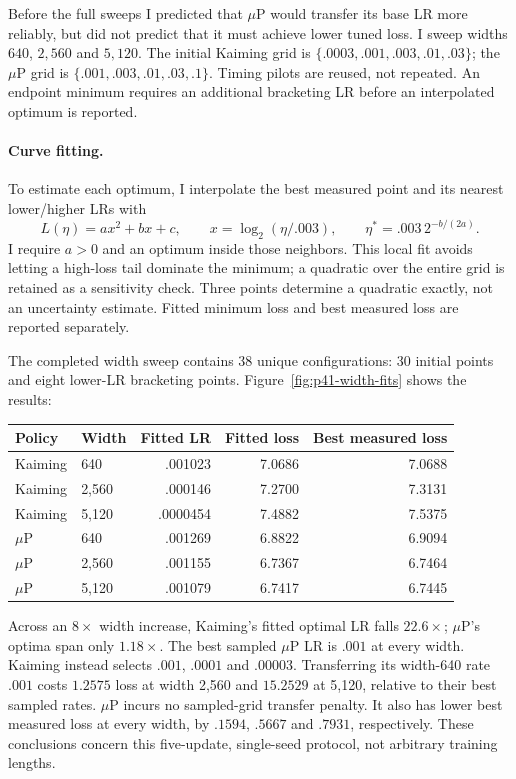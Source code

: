 \documentclass{article}
\begin{document}
Before the full sweeps I predicted that $\mu$P would transfer its base LR
more reliably, but did not predict that it must achieve lower tuned loss.
I sweep widths $640$, $2{,}560$ and $5{,}120$. The initial Kaiming grid is
$\{.0003,.001,.003,.01,.03\}$; the $\mu$P grid is
$\{.001,.003,.01,.03,.1\}$. Timing pilots are reused, not repeated.
An endpoint minimum requires an additional bracketing LR before an
interpolated optimum is reported.

\paragraph{Curve fitting.} To estimate each optimum, I interpolate the
best measured point and its nearest lower/higher LRs with
\[
 L(\eta)=a x^2+b x+c,\qquad x=\log_2(\eta/.003),\qquad
 \eta^*=.003\,2^{-b/(2a)}.
\]
I require $a>0$ and an optimum inside those neighbors. This local fit
avoids letting a high-loss tail dominate the minimum; a quadratic over
the entire grid is retained as a sensitivity check. Three points determine
a quadratic exactly, not an uncertainty estimate. Fitted minimum loss
and best measured loss are reported separately.

The completed width sweep contains 38 unique configurations: 30 initial
points and eight lower-LR bracketing points. Figure~\ref{fig:p41-width-fits}
shows the results:
\begin{center}
\begin{tabular}{llrrr}
\toprule
Policy & Width & Fitted LR & Fitted loss & Best measured loss \\
\midrule
Kaiming & 640 & .001023 & 7.0686 & 7.0688 \\
Kaiming & 2,560 & .000146 & 7.2700 & 7.3131 \\
Kaiming & 5,120 & .0000454 & 7.4882 & 7.5375 \\
$\mu$P & 640 & .001269 & 6.8822 & 6.9094 \\
$\mu$P & 2,560 & .001155 & 6.7367 & 6.7464 \\
$\mu$P & 5,120 & .001079 & 6.7417 & 6.7445 \\
\bottomrule
\end{tabular}
\end{center}
Across an $8\times$ width increase, Kaiming's fitted optimal LR falls
$22.6\times$; $\mu$P's optima span only $1.18\times$. The best sampled
$\mu$P LR is $.001$ at every width. Kaiming instead selects $.001$,
$.0001$ and $.00003$. Transferring its width-640 rate $.001$ costs
$1.2575$ loss at width 2,560 and $15.2529$ at 5,120, relative to their
best sampled rates. $\mu$P incurs no sampled-grid transfer penalty.
It also has lower best measured loss at every width, by $.1594$, $.5667$
and $.7931$, respectively. These conclusions concern this five-update,
single-seed protocol, not arbitrary training lengths.
\end{document}
